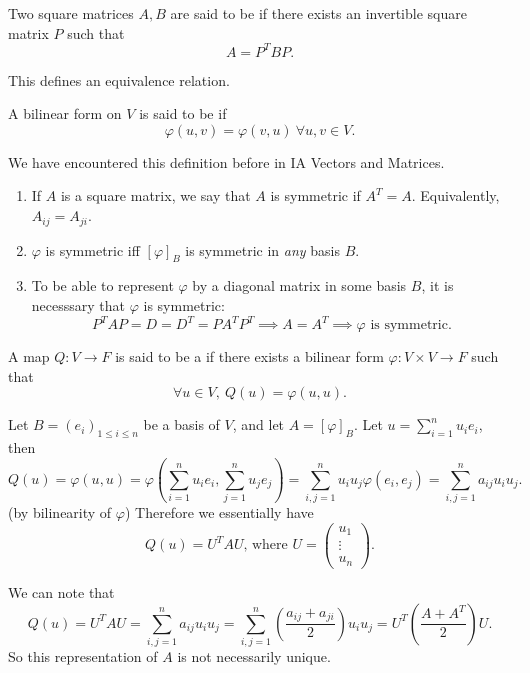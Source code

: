 \documentclass[a4paper]{scrartcl}
\begin{document}
\begin{definition}
     Two square matrices $A,B$ are said to be  if there exists an invertible square matrix $P$ such that 
     \[A=P^T B P.\]
\end{definition}
\begin{remark}
     This defines an equivalence relation.
\end{remark}
\begin{definition}
     A bilinear form on $V$ is said to be  if 
     \[\varphi(u,v)=\varphi(v,u) \ \forall u,v \in V.\]
\end{definition}
\begin{remark}
     We have encountered this definition before in IA Vectors and Matrices.
    \begin{enumerate}
        \item If $A$ is a square matrix, we say that $A$ is symmetric if $A^T=A$. Equivalently, $A_{ij}=A_{ji}$.
        \item $\varphi$ is symmetric iff $[\varphi]_B$ is symmetric in \emph{any} basis $B$.
        \item To be able to represent $\varphi$ by a diagonal matrix in some basis $B$, it is necesssary that $\varphi$ is symmetric: 
        \[P^T AP=D=D^T=P A^T P^T \implies A=A^T \implies \varphi \text{ is symmetric} .\]
        
    \end{enumerate}
     
\end{remark}
\begin{definition}
     A map $Q: V \rightarrow F$ is said to be a  if there exists a bilinear form $\varphi: V \times V \rightarrow F$ such that 
     \[\forall u \in V, \ Q(u)=\varphi (u,u).\]
\end{definition}
\begin{remark}
     Let $B=(e_i)_{1 \leq i \leq n}$ be a basis of $V$, and let $A=[\varphi]_B$. Let $u=\sum_{i=1}^{n}u_i e_i$, then 
     \[Q (u)=\varphi (u,u)=\varphi \left(\sum_{i=1}^{n}u_i e_i, \sum_{j=1}^{n}u_j e_j\right)=\sum_{i,j=1}^{n}u_i u_j \varphi(e_i,e_j)=\sum_{i,j=1}^{n}a_{ij} u_i u_j.\]
     (by bilinearity of $\varphi$)
     Therefore we essentially have 
     \[Q (u)=U^T A U \text{, where } U=\begin{pmatrix}
     u_1\\\vdots \\ u_n
     \end{pmatrix}
     .\]
\end{remark}
\begin{remark}
     We can note that 
     \[Q (u)=U^T A U =\sum_{i,j=1}^{n}a_{ij}u_i u_j=\sum_{i,j=1}^{n}(\frac{a_{ij}+a_{ji}}{2})u_i u_j=U^T (\frac{A+A^T}{2}) U.\]
     So this representation of $A$ is not necessarily unique.
\end{remark}
\end{document}
